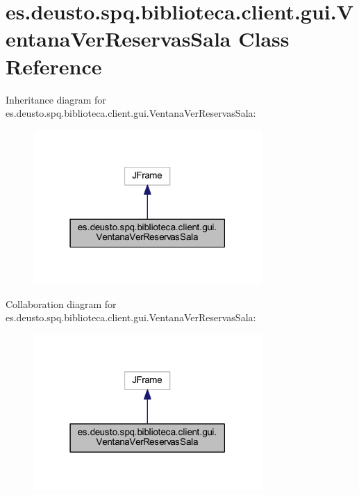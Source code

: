 \hypertarget{classes_1_1deusto_1_1spq_1_1biblioteca_1_1client_1_1gui_1_1_ventana_ver_reservas_sala}{}\section{es.\+deusto.\+spq.\+biblioteca.\+client.\+gui.\+Ventana\+Ver\+Reservas\+Sala Class Reference}
\label{classes_1_1deusto_1_1spq_1_1biblioteca_1_1client_1_1gui_1_1_ventana_ver_reservas_sala}


Inheritance diagram for es.\+deusto.\+spq.\+biblioteca.\+client.\+gui.\+Ventana\+Ver\+Reservas\+Sala\+:
\nopagebreak
\begin{figure}[H]
\begin{center}
\leavevmode
\includegraphics[width=247pt]{classes_1_1deusto_1_1spq_1_1biblioteca_1_1client_1_1gui_1_1_ventana_ver_reservas_sala__inherit__graph}
\end{center}
\end{figure}


Collaboration diagram for es.\+deusto.\+spq.\+biblioteca.\+client.\+gui.\+Ventana\+Ver\+Reservas\+Sala\+:
\nopagebreak
\begin{figure}[H]
\begin{center}
\leavevmode
\includegraphics[width=247pt]{classes_1_1deusto_1_1spq_1_1biblioteca_1_1client_1_1gui_1_1_ventana_ver_reservas_sala__coll__graph}
\end{center}
\end{figure}
